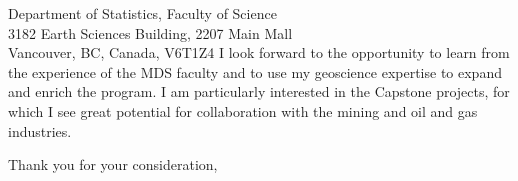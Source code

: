 \documentclass[11pt]{letter}
\begin{document}
\begin{letter}{
    Department of Statistics, Faculty of Science
    \\
    3182 Earth Sciences Building, 2207 Main Mall
    \\
    Vancouver, BC, Canada, V6T1Z4
}
I look forward to the opportunity to learn from the experience of the MDS
faculty and to use my geoscience expertise to expand and enrich the program.
I am particularly interested in the Capstone projects, for which I see great
potential for collaboration with the mining and oil and gas industries.

\closing{Thank you for your consideration,}

\end{letter}
\end{document}
